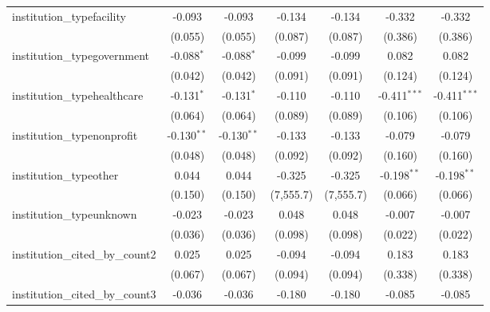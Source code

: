 \begin{tabular}{lcccccc}
   institution\_typefacility             & -0.093         & -0.093         & -0.134        & -0.134        & -0.332         & -0.332\\   
                                         & (0.055)        & (0.055)        & (0.087)       & (0.087)       & (0.386)        & (0.386)\\   
   institution\_typegovernment           & -0.088$^{*}$   & -0.088$^{*}$   & -0.099        & -0.099        & 0.082          & 0.082\\   
                                         & (0.042)        & (0.042)        & (0.091)       & (0.091)       & (0.124)        & (0.124)\\   
   institution\_typehealthcare           & -0.131$^{*}$   & -0.131$^{*}$   & -0.110        & -0.110        & -0.411$^{***}$ & -0.411$^{***}$\\   
                                         & (0.064)        & (0.064)        & (0.089)       & (0.089)       & (0.106)        & (0.106)\\   
   institution\_typenonprofit            & -0.130$^{**}$  & -0.130$^{**}$  & -0.133        & -0.133        & -0.079         & -0.079\\   
                                         & (0.048)        & (0.048)        & (0.092)       & (0.092)       & (0.160)        & (0.160)\\   
   institution\_typeother                & 0.044          & 0.044          & -0.325        & -0.325        & -0.198$^{**}$  & -0.198$^{**}$\\   
                                         & (0.150)        & (0.150)        & (7,555.7)     & (7,555.7)     & (0.066)        & (0.066)\\   
   institution\_typeunknown              & -0.023         & -0.023         & 0.048         & 0.048         & -0.007         & -0.007\\   
                                         & (0.036)        & (0.036)        & (0.098)       & (0.098)       & (0.022)        & (0.022)\\   
   institution\_cited\_by\_count2        & 0.025          & 0.025          & -0.094        & -0.094        & 0.183          & 0.183\\   
                                         & (0.067)        & (0.067)        & (0.094)       & (0.094)       & (0.338)        & (0.338)\\   
   institution\_cited\_by\_count3        & -0.036         & -0.036         & -0.180        & -0.180        & -0.085         & -0.085\\   

\end{tabular}
